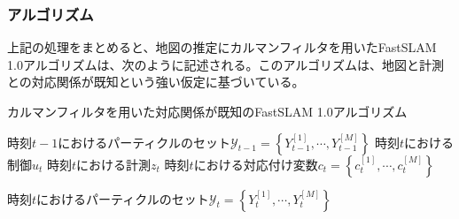 \documentclass[dvipdfmx,a4paper]{jsarticle}
\begin{document}
\subsubsection{アルゴリズム}
上記の処理をまとめると、地図の推定にカルマンフィルタを用いたFastSLAM 1.0アルゴリズムは、次のように記述される。このアルゴリズムは、地図と計測との対応関係が既知という強い仮定に基づいている。

\begin{algorithm}[H]
	\caption{カルマンフィルタを用いた対応関係が既知のFastSLAM 1.0アルゴリズム}
	\label{alg:fast-slam-1-kalman-filter}
	\begin{algorithmic}[1]
		\Require
			\Statex 時刻$t - 1$におけるパーティクルのセット$\mathcal{Y}_{t - 1} = \left\{ Y_{t - 1}^{[1]}, \cdots, Y_{t - 1}^{[M]} \right\}$
			\Statex 時刻$t$における制御$u_t$
			\Statex 時刻$t$における計測$z_t$
			\Statex 時刻$t$における対応付け変数$c_t = \left\{ c_t^{[1]}, \cdots, c_t^{[M]} \right\}$

		\Ensure
			\Statex 時刻$t$におけるパーティクルのセット$\mathcal{Y}_t = \left\{ Y_t^{[1]}, \cdots, Y_t^{[M]} \right\}$ \newline
		

\end{algorithmic}
\end{algorithm}
\end{document}

